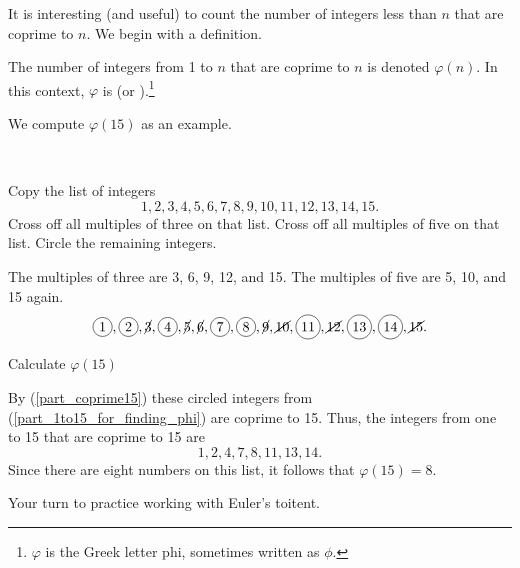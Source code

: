 It is interesting (and useful) to count the number of integers less than $n$ that are coprime to $n$.  We begin with a definition.

\begin{defn}
\label{defn_euler_phi_fn}  
    The number of integers from 1 to $n$ that are coprime to $n$ is denoted $\varphi(n)$.  In this context, $\varphi$ is  (or ).\footnote{$\varphi$ is the Greek letter phi, sometimes written as $\phi$.} 
\end{defn}

We compute $\varphi(15)$ as an example.

\begin{exam}
\label{exam_eulers_phi15}  
~
    \begin{apart}
        \item \label{part_1to15_for_finding_phi} Copy the list of integers $$1,2,3,4,5,6,7,8,9,10,11,12,13,14,15.$$
        Cross off all multiples of three on that list. Cross off all multiples of five on that list. Circle the remaining integers.  
            \begin{soln}
                The multiples of three are 3, 6, 9, 12, and 15.  The multiples of five are 5, 10, and 15 again.  $$\circled{1},\circled{2},\cancel{3},\circled{4},\cancel{5},\cancel{6},\circled{7},\circled{8},\cancel{9},\cancel{10},\circled{11},\cancel{12},\circled{13},\circled{14},\cancel{15}.$$        
            \end{soln}

        \item Calculate $\varphi(15)$
            \begin{soln}
                By  (\ref{part_coprime15}) these circled integers from (\ref{part_1to15_for_finding_phi}) are coprime to 15. Thus, the integers from one to 15 that are coprime to 15 are $$1, 2, 4, 7, 8, 11, 13, 14.$$
                Since there are eight numbers on this list, it follows that $\varphi(15)=8$.
            \end{soln}
    \end{apart}
\end{exam}

Your turn to practice working with Euler's toitent.

